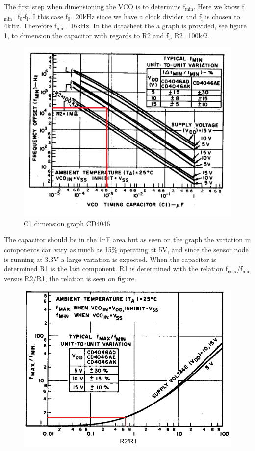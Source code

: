 The first step when dimensioning the VCO is to determine f$_{\text{min}}$. Here we know f$_{\text{min}}$=f$_{\text{0}}$-f$_{\text{l}}$. I this case f$_{\text{0}}$=20kHz since we have a clock divider and f$_{\text{l}}$ is chosen to 4kHz. Therefore f$_{\text{min}}$=16kHz. In the datasheet the a graph is provided, see figure \ref{graph:C1}, to dimension the capacitor with regards to R2 and f$_{\text{l}}$, R2=100k$\Omega$.

\begin{figure}[H]
	\centering
	\includegraphics[width=.7\textwidth]{billeder/c1_graph_cd4046}
	\caption{C1 dimension graph CD4046}
	\label{graph:C1}
\end{figure}

The capacitor should be in the 1nF area but as seen on the graph the variation in components can vary as much as 15\% operating at 5V, and since the sensor node is running at 3.3V a large variation is expected. When the capacitor is determined R1 is the last component. R1 is determined with the relation f$_{\text{max}}$/f$_{\text{min}}$ versus R2/R1, the relation is seen on figure

\begin{figure}[H]
	\centering
	\includegraphics[width=.7\textwidth]{billeder/R1_graph_cd4046}
\end{figure}




